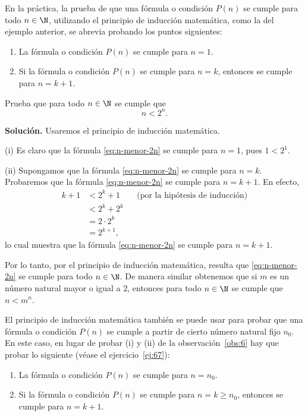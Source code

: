 \documentclass[12pt,a4paper]{book}
\begin{document}
    \begin{observacion}\label{obs:6}
        En la práctica, la prueba de que una fórmula o condición
        $P(n)$ se cumple para todo $n\in\N$, utilizando el principio de inducción matemática,
        como la del ejemplo anterior, se abrevia probando los puntos siguientes:
        \begin{enumerate}[label=(\roman*),nosep]
            \item La fórmula o condición $P(n)$ se cumple para $n=1$.
            \item Si la fórmula o condición $P(n)$ se cumple para $n=k$, entonces se cumple
            para $n=k+1$.
        \end{enumerate}
    \end{observacion}

    \begin{ejemplo}\label{ejm:3}
        Prueba que para todo $n\in\N$ se cumple que
        \begin{equation}\label{eq:n-menor-2n}
            n<2^{n}.
        \end{equation}

        \textbf{Solución.} Usaremos el principio de inducción matemática.

        (i) Es claro que la fórmula \eqref{eq:n-menor-2n} se cumple para $n=1$, pues $1<2^{1}$.

        (ii) Supongamos que la fórmula \eqref{eq:n-menor-2n} se cumple para $n=k$. Probaremos
        que la fórmula \eqref{eq:n-menor-2n} se cumple para $n=k+1$. En efecto,
        \begin{align*}
            k+1&<2^{k}+1 &&\text{(por la hipótesis de inducción)}\\
            &<2^{k}+2^{k}\\
            &=2\cdot 2^{k}\\
            &=2^{k+1},
        \end{align*}
        lo cual muestra que la fórmula \eqref{eq:n-menor-2n} se cumple para $n=k+1$.

        Por lo tanto, por el principio de inducción matemática, resulta que \eqref{eq:n-menor-2n}
        se cumple para todo $n\in\N$. De manera similar obtenemos que si $m$ es un
        número natural mayor o igual a $2$, entonces para todo $n\in\N$ se cumple que
        $n<m^{n}$.
    \end{ejemplo}

    El principio de inducción matemática también se puede usar para probar
    que una fórmula o condición $P(n)$ se cumple a partir de cierto número natural
    fijo $n_{0}$. En este caso, en lugar de probar (i) y (ii) de la observación~\ref{obs:6} hay que
    probar lo siguiente (véase el ejercicio~\ref{ej:67}):
    \begin{enumerate}[label=(\roman*),nosep]
        \item La fórmula o condición $P(n)$ se cumple para $n=n_{0}$.
        \item Si la fórmula o condición $P(n)$ se cumple para $n=k\geq n_{0}$, entonces se
        cumple para $n=k+1$.
    \end{enumerate}
\end{document}
